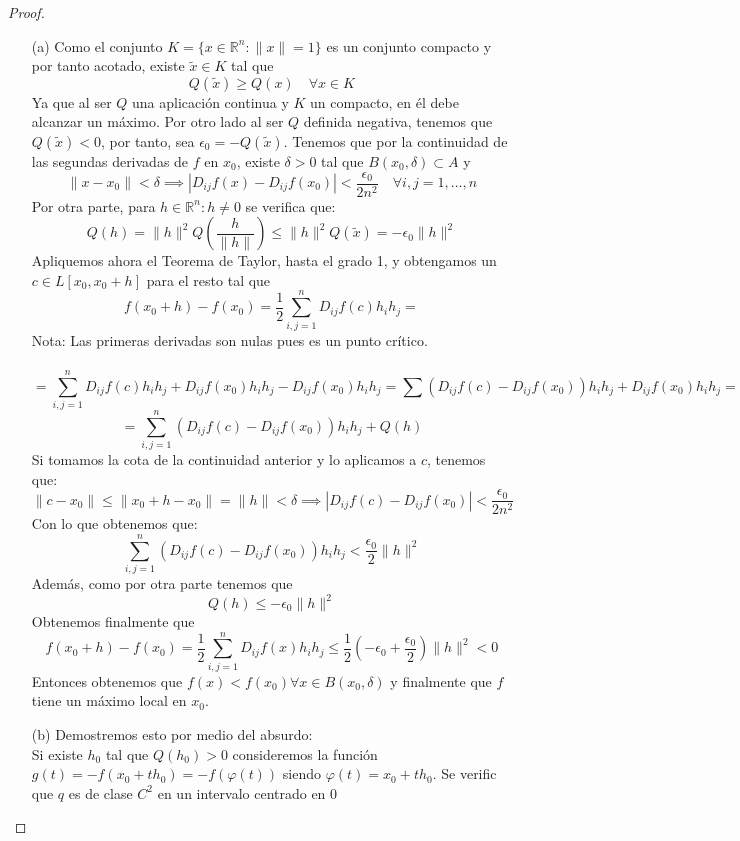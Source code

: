 \begin{proof}
    \begin{enumerate}
        \item[(a)] Como el conjunto $K = \{x \in \mathbb{R}^n : \|x\| = 1\}$ es un conjunto compacto y por tanto acotado, existe $\tilde{x} \in K$ tal que
        $$Q(\tilde{x}) \geq Q(x) \quad \forall x \in K$$
        Ya que al ser $Q$ una aplicación continua y $K$ un compacto, en él debe alcanzar un máximo. Por otro lado al ser $Q$ definida negativa, tenemos que $Q(\tilde{x}) < 0$, por tanto, sea $\epsilon_0 = -Q(\tilde{x})$. 
        Tenemos que por la continuidad de las segundas derivadas de $f$ en $x_0$, existe $\delta > 0$ tal que $B(x_0, \delta) \subset A$ y 
        $$\|x - x_0\| < \delta \implies |D_{ij}f(x) - D_{ij}f(x_0)| < \frac{\epsilon_0}{2n^2} \quad \forall i, j = 1, \ldots, n$$
        Por otra parte, para $h \in \mathbb{R}^n : h \neq 0$ se verifica que: 
        $$Q(h) = \|h\|^2 Q(\frac{h}{\|h\|}) \leq \|h\|^2 Q(\tilde{x}) = -\epsilon_0 \|h\|^2$$
        Apliquemos ahora el Teorema de Taylor, hasta el grado 1, y obtengamos un $c \in L[x_0, x_0 + h]$ para el resto tal que
        $$f(x_0 + h) - f(x_0) = \frac{1}{2} \sum_{i, j = 1}^{n} D_{ij}f(c) h_i h_j = $$
        Nota: Las primeras derivadas son nulas pues es un punto crítico. \\\\
        $$ = \sum_{i, j = 1}^{n} D_{ij}f(c)h_i h_j + D_{ij}f(x_0)h_i h_j - D_{ij}f(x_0)h_i h_j = \sum (D_{ij}f(c) - D_{ij}f(x_0))h_i h_j + D_{ij}f(x_0)h_i h_j = $$
        $$ = \sum_{i, j = 1}^{n} (D_{ij}f(c) - D_{ij}f(x_0))h_i h_j + Q(h)$$
        Si tomamos la cota de la continuidad anterior y lo aplicamos a $c$, tenemos que: 
        $$ \|c - x_0 \| \leq \|x_0 + h - x_0\| = \|h\| < \delta \implies |D_{ij}f(c) - D_{ij}f(x_0)| < \frac{\epsilon_0}{2n^2}$$
        Con lo que obtenemos que: 
        $$ \sum_{i, j =1}^{n} (D_{ij}f(c) - D_{ij}f(x_0))h_i h_j < \frac{\epsilon_0}{2} \|h\|^2$$
        Además, como por otra parte tenemos que 
        $$Q(h) \leq -\epsilon_0 \|h\|^2$$ 
        Obtenemos finalmente que
        $$f(x_0 + h) - f(x_0) = \frac{1}{2} \sum_{i, j =1}^{n} D_{ij}f(x)h_i h_j \leq \frac{1}{2} (-\epsilon_0 + \frac{\epsilon_0}{2}) \|h\|^2 < 0$$
        Entonces obtenemos que $f(x) < f(x_0) \forall x \in B(x_0, \delta)$ y finalmente que $f$ tiene un máximo local en $x_0$. 
        \item[(b)] Demostremos esto por medio del absurdo: \\
        Si existe $h_0$ tal que $Q(h_0) > 0$ consideremos la función $g(t) = -f(x_0 + th_0) = -f(\varphi(t))$ siendo $\varphi(t) = x_0 + th_0$. Se verific que $q$ es de clase $C^2$ en un intervalo centrado en $0$

\end{enumerate}
\end{proof}
